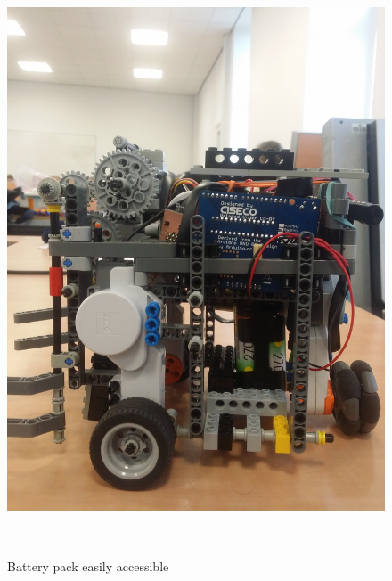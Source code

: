 \documentclass[12pt]{article}
\begin{document}
\begin{figure}
	\centering
	\begin{minipage}[b]{.48\textwidth}
        \centering
		\includegraphics[scale=.065,angle=-90]{battery.jpg}
		\caption{Battery pack easily accessible}
		\label{fig:battery}
	\end{minipage}
	~
	\begin{minipage}[b]{.48\textwidth}
        \centering

\end{minipage}
\end{figure}
\end{document}

